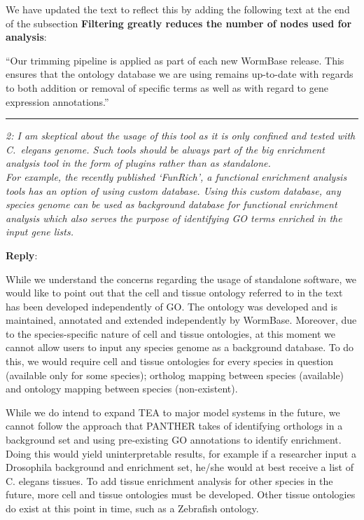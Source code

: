 \documentclass[12pt,stdletter,orderfromtodate,sigleft]{newlfm}
\newcommand{\pointRaised}[2]{\medskip \hrule \noindent 
                \textsl{{\fontseries{b} #1}: #2}}
\newcommand{\reply}{\noindent \textbf{Reply}:\ }
\begin{document}
\begin{newlfm}
{We have updated the text to reflect this by adding the following text at the end of the subsection \textbf{Filtering greatly reduces the number of nodes used for analysis}:

``Our trimming pipeline is applied as part of each new WormBase release. This ensures that the ontology database we are using remains up-to-date with regards to both addition or removal of specific terms as well as with regard to gene expression annotations.''

}

\pointRaised{2}{I am skeptical about the usage of this tool as it is only confined and tested with \emph{C.~elegans} genome. Such tools should be always part of the big enrichment analysis tool in the form of plugins rather than as standalone.\\
For example, the recently published `FunRich', a functional enrichment analysis tools has an option of using custom database. Using this custom database, any species genome can be used as background database for functional enrichment analysis which also serves the purpose of identifying GO terms enriched in the input gene lists. 
}

\reply{While we understand the concerns regarding the usage of standalone software, we would like to point out that the cell and tissue ontology referred to in the text has been developed independently of GO. The ontology was developed and is maintained, annotated and extended independently by WormBase. Moreover, due to the species-specific nature of cell and tissue ontologies, at this moment we cannot allow users to input any species genome as a background database. To do this, we would require cell and tissue ontologies for every species in question (available only for some species); ortholog mapping between species (available) and ontology mapping between species (non-existent).

While we do intend to expand TEA to major model systems in the future, we cannot follow the approach that PANTHER takes of identifying orthologs in a background set and using pre-existing GO annotations to identify enrichment. Doing this would yield uninterpretable results, for example if a researcher input a Drosophila background and enrichment set, he/she would at best receive a list of C. elegans tissues. To add tissue enrichment analysis for other species in the future, more cell and tissue ontologies must be developed. Other tissue ontologies do exist at this point in time, such as a Zebrafish ontology.
}


\end{newlfm}
\end{document}

